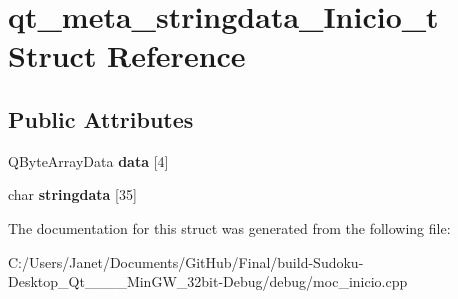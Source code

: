 \hypertarget{structqt__meta__stringdata___inicio__t}{\section{qt\-\_\-meta\-\_\-stringdata\-\_\-\-Inicio\-\_\-t Struct Reference}
\label{structqt__meta__stringdata___inicio__t}
}
\subsection*{Public Attributes}
\begin{DoxyCompactItemize}
\item 
\hypertarget{structqt__meta__stringdata___inicio__t_a8523396fd1dfbb6099467bf7c19f37fc}{Q\-Byte\-Array\-Data {\bfseries data} \mbox{[}4\mbox{]}}\label{structqt__meta__stringdata___inicio__t_a8523396fd1dfbb6099467bf7c19f37fc}

\item 
\hypertarget{structqt__meta__stringdata___inicio__t_ae3d2ecd95c9ddaf94f6cc7efb002f617}{char {\bfseries stringdata} \mbox{[}35\mbox{]}}\label{structqt__meta__stringdata___inicio__t_ae3d2ecd95c9ddaf94f6cc7efb002f617}

\end{DoxyCompactItemize}


The documentation for this struct was generated from the following file\-:\begin{DoxyCompactItemize}
\item 
C\-:/\-Users/\-Janet/\-Documents/\-Git\-Hub/\-Final/build-\/\-Sudoku-\/\-Desktop\-\_\-\-Qt\-\_\-\_\-\_\-\_\-\-Min\-G\-W\-\_\-32bit-\/\-Debug/debug/moc\-\_\-inicio.\-cpp\end{DoxyCompactItemize}
